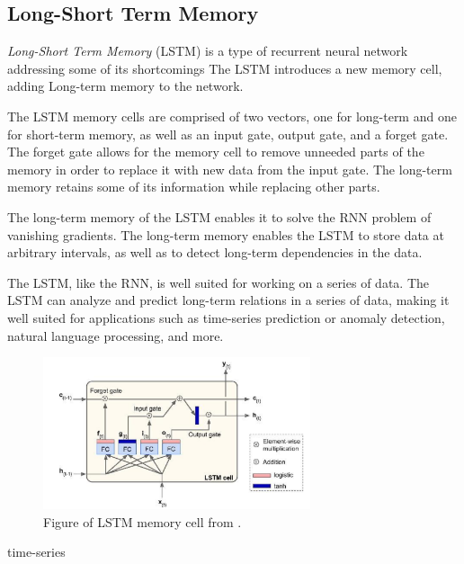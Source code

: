 \subsection{Long-Short Term Memory}
\label{section:BT:LSTM}

\textit{Long-Short Term Memory} (LSTM) is a type of recurrent neural network addressing some of its shortcomings
The LSTM introduces a new memory cell, adding Long-term memory to the network.

The LSTM memory cells are comprised of two vectors, one for long-term and one for short-term memory,
as well as an input gate, output gate, and a forget gate.
The forget gate allows for the memory cell to remove unneeded parts of the memory in order to replace it with new data from the input gate.
The long-term memory retains some of its information while replacing other parts.

The long-term memory of the LSTM enables it to solve the RNN problem of vanishing gradients.
The long-term memory enables the LSTM to store data at arbitrary intervals, as well as to detect long-term dependencies in the data.

The LSTM, like the RNN, is well suited for working on a series of data.
The LSTM can analyze and predict long-term relations in a series of data, making it well suited for applications such as time-series prediction or anomaly detection,
natural language processing, and more.

\begin{figure}[h!]
  \centering
  \includegraphics[width=0.7\textwidth]{./sections/BT/figures/lstm_cell_hands_on.png}
  \hfill
  \caption{Figure of LSTM memory cell from \cite[p.~492]{Geron2017}.}
  \label{fig:lstm-memory-cell}
\end{figure}



\cite[p.~492-493]{Geron2017}

time-series
